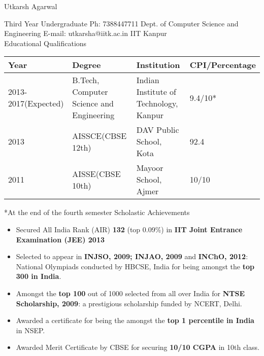 \documentclass{article}
\begin{document}
\sffamily
\begin{flushleft}
{\Huge{Utkarsh Agarwal}}
\end{flushleft}
\vspace{0.5cm}
{\small Third Year Undergraduate \hspace{11.5cm} Ph: 7388447711\newline
       Dept. of Computer Science and Engineering \hspace{9.05cm} E-mail: utkarsha@iitk.ac.in\newline
       IIT Kanpur\newline
}
\\
\hspace{-2cm}
{\Large Educational Qualifications}
\newline
\newline
\begin{tabular}{| l | l | l |l|}
\hline
Year         & Degree & Institution & CPI/Percentage\\ \hline
2013-2017(Expected) & B.Tech, Computer Science and Engineering & Indian Institute of Technology, Kanpur & 9.4/10*\\ \hline
2013 & AISSCE(CBSE 12th) & DAV Public School, Kota & 92.4 \\ \hline
2011 & AISSE(CBSE 10th) & Mayoor School, Ajmer & 10/10\\ \hline
\end{tabular}
*At the end of the fourth semester \newline\newline\newline
{\Large Scholastic Achievements}
	\begin{itemize}
\item Secured All India Rank (AIR) \textbf {132} (top 0.09\%) in \textbf {IIT Joint Entrance Examination (JEE) 2013} 
\item Selected to appear in \textbf{INJSO, 2009; INJAO, 2009} and \textbf{INChO, 2012}: National Olympiads conducted by HBCSE, India for being amongst the \textbf{top 300 in India}.
\item Amongst the \textbf{top 100} out of 1000 selected from all over India for \textbf{NTSE Scholarship, 2009}: a prestigious scholarship funded by NCERT, Delhi.
\item Awarded a certificate for being the amongst the \textbf{top 1 percentile in India} in  NSEP.
\item Awarded Merit Certificate by CBSE for securing \textbf{10/10 CGPA} in 10th class.
	\end{itemize}
\end{document}
